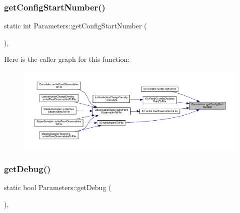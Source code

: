 \mbox{\label{class_parameters_a58f15668b37e705d34d6588e287e4bc0}} 
\subsubsection{\texorpdfstring{getConfigStartNumber()}{getConfigStartNumber()}}
{\footnotesize\ttfamily static int Parameters\+::get\+Config\+Start\+Number (\begin{DoxyParamCaption}{ }\end{DoxyParamCaption})\hspace{0.3cm}{\ttfamily [inline]}, {\ttfamily [static]}}

Here is the caller graph for this function\+:\nopagebreak
\begin{figure}[H]
\begin{center}
\leavevmode
\includegraphics[width=350pt]{class_parameters_a58f15668b37e705d34d6588e287e4bc0_icgraph}
\end{center}
\end{figure}
\mbox{\label{class_parameters_a265e274127b6d845e43c66d94463f051}} 
\subsubsection{\texorpdfstring{getDebug()}{getDebug()}}
{\footnotesize\ttfamily static bool Parameters\+::get\+Debug (\begin{DoxyParamCaption}{ }\end{DoxyParamCaption})\hspace{0.3cm}{\ttfamily [inline]}, {\ttfamily [static]}}

